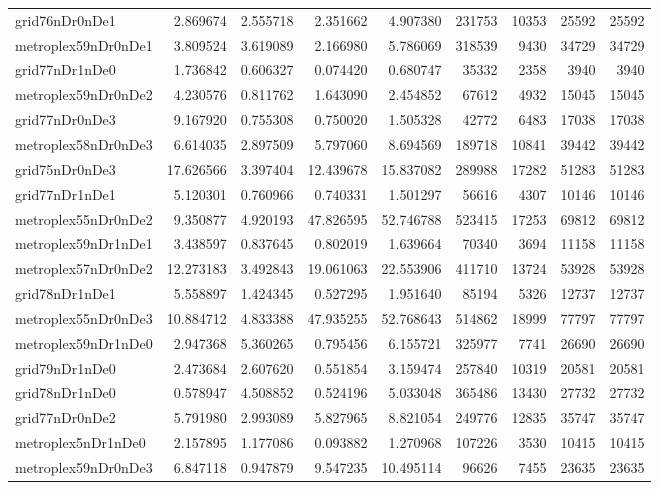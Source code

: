 \begin{longtable}{|l|r|r|r|r|r|r|r|r|}
grid76nDr0nDe1 & 2.869674 & 2.555718 & 2.351662 & 4.907380 & 231753 & 10353 & 25592 & 25592 \\
metroplex59nDr0nDe1 & 3.809524 & 3.619089 & 2.166980 & 5.786069 & 318539 & 9430 & 34729 & 34729 \\
grid77nDr1nDe0 & 1.736842 & 0.606327 & 0.074420 & 0.680747 & 35332 & 2358 & 3940 & 3940 \\
metroplex59nDr0nDe2 & 4.230576 & 0.811762 & 1.643090 & 2.454852 & 67612 & 4932 & 15045 & 15045 \\
grid77nDr0nDe3 & 9.167920 & 0.755308 & 0.750020 & 1.505328 & 42772 & 6483 & 17038 & 17038 \\
metroplex58nDr0nDe3 & 6.614035 & 2.897509 & 5.797060 & 8.694569 & 189718 & 10841 & 39442 & 39442 \\
grid75nDr0nDe3 & 17.626566 & 3.397404 & 12.439678 & 15.837082 & 289988 & 17282 & 51283 & 51283 \\
grid77nDr1nDe1 & 5.120301 & 0.760966 & 0.740331 & 1.501297 & 56616 & 4307 & 10146 & 10146 \\
metroplex55nDr0nDe2 & 9.350877 & 4.920193 & 47.826595 & 52.746788 & 523415 & 17253 & 69812 & 69812 \\
metroplex59nDr1nDe1 & 3.438597 & 0.837645 & 0.802019 & 1.639664 & 70340 & 3694 & 11158 & 11158 \\
metroplex57nDr0nDe2 & 12.273183 & 3.492843 & 19.061063 & 22.553906 & 411710 & 13724 & 53928 & 53928 \\
grid78nDr1nDe1 & 5.558897 & 1.424345 & 0.527295 & 1.951640 & 85194 & 5326 & 12737 & 12737 \\
metroplex55nDr0nDe3 & 10.884712 & 4.833388 & 47.935255 & 52.768643 & 514862 & 18999 & 77797 & 77797 \\
metroplex59nDr1nDe0 & 2.947368 & 5.360265 & 0.795456 & 6.155721 & 325977 & 7741 & 26690 & 26690 \\
grid79nDr1nDe0 & 2.473684 & 2.607620 & 0.551854 & 3.159474 & 257840 & 10319 & 20581 & 20581 \\
grid78nDr1nDe0 & 0.578947 & 4.508852 & 0.524196 & 5.033048 & 365486 & 13430 & 27732 & 27732 \\
grid77nDr0nDe2 & 5.791980 & 2.993089 & 5.827965 & 8.821054 & 249776 & 12835 & 35747 & 35747 \\
metroplex5nDr1nDe0 & 2.157895 & 1.177086 & 0.093882 & 1.270968 & 107226 & 3530 & 10415 & 10415 \\
metroplex59nDr0nDe3 & 6.847118 & 0.947879 & 9.547235 & 10.495114 & 96626 & 7455 & 23635 & 23635 \\

\end{longtable}
